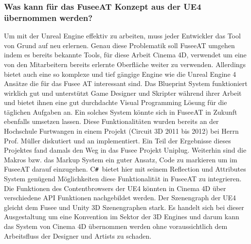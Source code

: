 \documentclass[pagesize, paper=a4, fontsize=12pt, titlepage=true, headings=small, headnosepline, abstractoff, liststotoc, nochapterprefix, plainheadsepline, twoside]{scrreprt}
\newcommand{\CSS}{C\texttt{\# }}
\begin{document}
\subsubsection{Was kann für das FuseeAT Konzept aus der UE4 übernommen werden?}
Um mit der Unreal Engine effektiv zu arbeiten, muss jeder Entwickler das Tool von Grund auf neu erlernen. Genau diese Problematik soll FuseeAT umgehen indem es bereits bekannte Tools, für diese Arbeit Cinema 4D, verwendet um eine von den Mitarbeitern bereits erlernte Oberfläche weiter zu verwenden. Allerdings bietet auch eine so komplexe und tief gängige Engine wie die Unreal Engine 4 Ansätze die für das Fusee AT interessant sind. Das Blueprint System funktioniert wirklich gut und unterstützt Game Designer und Skripter während ihrer Arbeit und bietet ihnen eine gut durchdachte Visual Programming Lösung für die täglichen Aufgaben an. Ein solches System könnte sich in FuseeAT in Zukunft ebenfalls umsetzen lassen. Diese Funktionalitäten wurden bereits an der Hochschule Furtwangen in einem Projekt (Circuit 3D 2011 bis 2012) bei Herrn Prof. Müller diskutiert und an implementiert. Ein Teil der Ergebnisse dieses Projektes fand damals den Weg in das Fusee Projekt Uniplug.
Weiterhin sind die Makros bzw. das Markup System ein guter Ansatz, Code zu markieren um im FuseeAT darauf einzugehen. \CSS bietet hier mit seinem Reflection und Attributes System genügend Möglichkeiten diese Funktionalität in FuseeAT zu integrieren. Die Funktionen des Contentbrowsers der UE4 könnten in Cinema 4D über verschiedene API Funktionen nachgebildet werden. Der Szenengraph der UE4 gleicht dem Fusee und Unity 3D Szenengraphen stark. Es handelt sich bei dieser Ausgestaltung um eine Konvention im Sektor der 3D Engines und darum kann das System von Cinema 4D übernommen werden ohne voraussichtlich dem Arbeitsfluss der Designer und Artists zu schaden.


\end{document}
